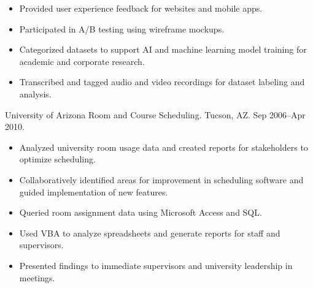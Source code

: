 \documentclass{article}
\begin{document}
\begin{description}
\begin{itemize}
  \item Provided user experience feedback for websites and mobile apps.
  \item Participated in A/B testing using wireframe mockups.
  \item Categorized datasets to support AI and machine learning model training for academic and corporate research.
  \item Transcribed and tagged audio and video recordings for dataset labeling and analysis.
\end{itemize}
\item[Administrative Assistant] University of Arizona Room and Course Scheduling. Tucson, AZ. Sep 2006–Apr 2010.
\begin{itemize}
  \item Analyzed university room usage data and created reports for stakeholders to optimize scheduling.
  \item Collaboratively identified areas for improvement in scheduling software and guided implementation of new features.
  \item Queried room assignment data using Microsoft Access and SQL.
  \item Used VBA to analyze spreadsheets and generate reports for staff and supervisors.
  \item Presented findings to immediate supervisors and university leadership in meetings.
\end{itemize}
\end{description}

\pagebreak

\vspace{-1em}
\end{document}
